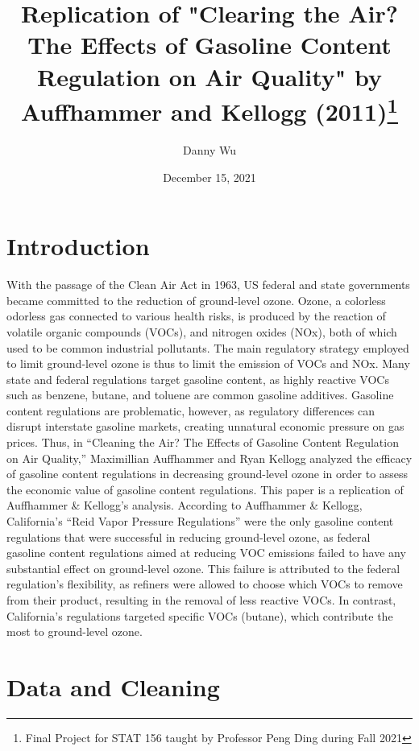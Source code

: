\documentclass{article}
\title{
    \Large Replication of "Clearing the Air? The Effects of Gasoline Content
Regulation on Air Quality" by Auffhammer and Kellogg (2011)\footnote{Final Project for STAT 156 taught by Professor Peng Ding during Fall 2021}}
\author{Danny Wu}
\date{December 15, 2021}
\begin{document}
\maketitle

\section{Introduction}

With the passage of the Clean Air Act in 1963, US federal and state governments became committed to the reduction of ground-level ozone. Ozone, a colorless odorless gas connected to various health risks, is produced by the reaction of volatile organic compounds (VOCs), and nitrogen oxides (NOx), both of which used to be common industrial pollutants. The main regulatory strategy employed to limit ground-level ozone is thus to limit the emission of VOCs and NOx. Many state and federal regulations target gasoline content, as highly reactive VOCs such as benzene, butane, and toluene are common gasoline additives. Gasoline content regulations are problematic, however, as regulatory differences can disrupt interstate gasoline markets, creating unnatural economic pressure on gas prices. Thus, in “Cleaning the Air? The Effects of Gasoline Content Regulation on Air Quality,” Maximillian Auffhammer and Ryan Kellogg analyzed the efficacy of gasoline content regulations in decreasing ground-level ozone in order to assess the economic value of gasoline content regulations. This paper is a replication of Auffhammer \& Kellogg’s analysis. According to Auffhammer \& Kellogg, California’s “Reid Vapor Pressure Regulations” were the only gasoline content regulations that were successful in reducing ground-level ozone, as federal gasoline content regulations aimed at reducing VOC emissions failed to have any substantial effect on ground-level ozone. This failure is attributed to the federal regulation’s flexibility, as refiners were allowed to choose which VOCs to remove from their product, resulting in the removal of less reactive VOCs. In contrast, California’s regulations targeted specific VOCs (butane), which contribute the most to ground-level ozone. 

\section{Data and Cleaning}
\end{document}
